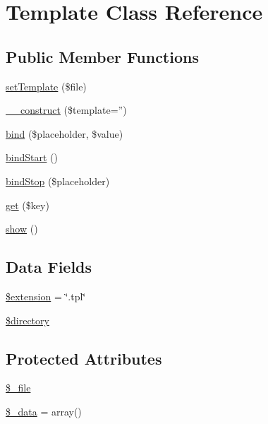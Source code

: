 \hypertarget{class_template}{\section{Template Class Reference}
\label{class_template}
}
\subsection*{Public Member Functions}
\begin{DoxyCompactItemize}
\item 
\hyperlink{class_template_a6ebd85d8c80be61c2f20f0bfeb9b5f7b}{set\-Template} (\$file)
\item 
\hyperlink{class_template_a5efa1ad8f3267178937b8fb23003bbd4}{\-\_\-\-\_\-construct} (\$template='')
\item 
\hyperlink{class_template_a820993178e7ede5e791288b36b9cef57}{bind} (\$placeholder, \$value)
\item 
\hyperlink{class_template_a309bb1dc9b92dd7ad5348e48245468f8}{bind\-Start} ()
\item 
\hyperlink{class_template_a71662e1be36ebe0eeabd5fa629e5c538}{bind\-Stop} (\$placeholder)
\item 
\hyperlink{class_template_a24a9bf83a1002d46ece83a93d14bd921}{get} (\$key)
\item 
\hyperlink{class_template_a2b8e3779f5bd8c38f70307574859bd36}{show} ()
\end{DoxyCompactItemize}
\subsection*{Data Fields}
\begin{DoxyCompactItemize}
\item 
\hyperlink{class_template_aed02cd2cd0ee08bd99a2ac1ef4f955ce}{\$extension} = \char`\"{}.tpl\char`\"{}
\item 
\hyperlink{class_template_a1b07c630eb02f770a082a013373a16d6}{\$directory}
\end{DoxyCompactItemize}
\subsection*{Protected Attributes}
\begin{DoxyCompactItemize}
\item 
\hyperlink{class_template_abddaf0b77086e2b7d920f5d1a9616889}{\$\-\_\-file}
\item 
\hyperlink{class_template_a5a3006290f2de94fff2dd63ca739d15a}{\$\-\_\-data} = array()
\end{DoxyCompactItemize}


